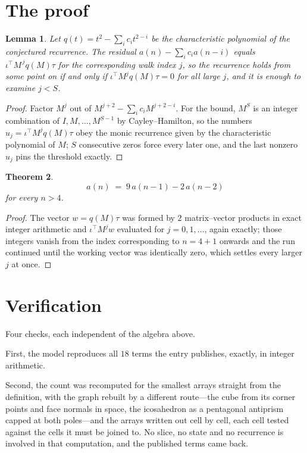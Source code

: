 \documentclass[11pt,a4paper]{article}
\theoremstyle{plain}
\newtheorem{theorem}{Theorem}
\newtheorem{lemma}[theorem]{Lemma}
\theoremstyle{definition}
\begin{document}
\section{The proof}

\begin{lemma}\label{lem:crit}
Let $q(t)=t^{2}-\sum_i c_it^{2-i}$ be the characteristic polynomial of the
conjectured recurrence. The residual $a(n)-\sum_ic_ia(n-i)$ equals
$\iota^{\!\top}M^{\,j}q(M)\tau$ for the corresponding walk index $j$, so the recurrence
holds from some point on if and only if $\iota^{\!\top}M^{j}q(M)\tau=0$ for all large $j$,
and it is enough to examine $j<S$.
\end{lemma}

\begin{proof}
Factor $M^{j}$ out of $M^{j+2}-\sum_ic_iM^{j+2-i}$. For the bound, $M^{S}$
is an integer combination of $I,M,\dots,M^{S-1}$ by Cayley--Hamilton, so the numbers
$u_j=\iota^{\!\top}M^{j}q(M)\tau$ obey the monic recurrence given by the characteristic
polynomial of $M$; $S$ consecutive zeros force every later one, and the last nonzero $u_j$
pins the threshold exactly.
\end{proof}

\begin{theorem}
\[
a(n)\;=\;9\,a(n-1) - 2\,a(n-2)
\]
for every $n>4$.
\end{theorem}

\begin{proof}
The vector $w=q(M)\tau$ was formed by $2$ matrix--vector products in exact integer
arithmetic and $\iota^{\!\top}M^{j}w$ evaluated for $j=0,1,\dots$, again exactly; those
integers vanish from the index corresponding to $n=4+1$ onwards and the run continued
until the working vector was identically zero, which settles every larger $j$ at once.
\end{proof}

\section{Verification}

Four checks, each independent of the algebra above.

First, the model reproduces all $18$ terms the entry publishes, exactly, in integer
arithmetic.

Second, the count was recomputed for the smallest arrays straight from the definition, with the
graph rebuilt by a different route---the cube from its corner points and face normals in space,
the icosahedron as a pentagonal antiprism capped at both poles---and the arrays written out cell
by cell, each cell tested against the cells it must be joined to. No slice, no state and no
recurrence is involved in that computation, and the published terms came back.
\end{document}
